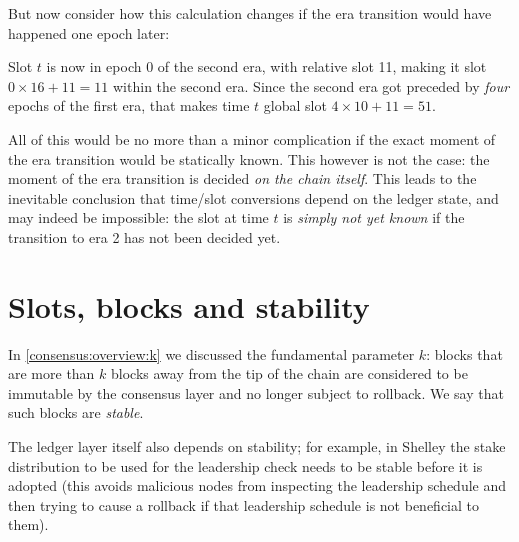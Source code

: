 But now consider how this calculation changes if the era transition would have
happened one epoch later:
%
\begin{center}
\end{center}
%
Slot $t$ is now in epoch 0 of the second era, with relative
slot 11, making it slot $0 \times 16 + 11 = 11$ within the second era.
Since the second era got preceded by \emph{four} epochs of the first era,
that makes time $t$ global slot $4 \times 10 + 11 = 51$.

All of this would be no more than a minor complication if the exact moment of
the era transition would be statically known. This however is not the case: the
moment of the era transition is decided \emph{on the chain itself}. This leads
to the inevitable conclusion that time/slot conversions depend on the ledger
state, and may indeed be impossible: the slot at time $t$ is \emph{simply not
yet known} if the transition to era 2 has not been decided yet.

\section{Slots, blocks and stability}
\label{time:slots-vs-blocks}

In \cref{consensus:overview:k} we discussed the fundamental parameter $k$:
blocks that are more than $k$ blocks away from the tip of the chain are
considered to be immutable by the consensus layer and no longer subject to
rollback. We say that such blocks are \emph{stable}.

The ledger layer itself also depends on stability; for example, in Shelley the
stake distribution to be used for the leadership check needs to be stable before
it is adopted (this avoids malicious nodes from inspecting the leadership
schedule and then trying to cause a rollback if that leadership schedule is not
beneficial to them).

